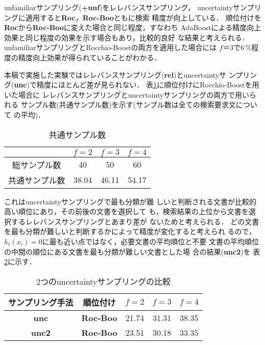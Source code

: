 unfamiliarサンプリング({\bf +unf})をレレバンスサンプリング，
uncertaintyサンプリングに適用すると{\bf Roc}，{\bf Roc-Boo}ともに検索
精度が向上している．
順位付けを{\bf Roc}から{\bf Roc-Boo}に変えた場合と同じ程度，すなわち
AdaBoostによる精度向上効果と同じ程度の効果を示す場合もあり，比較的良好
な結果と考えられる．
unfamiliarサンプリングとRocchio-Boostの両方を適用した場合には
$f＝3$で6\,\%程度の精度向上効果が得られていることがわかる．

本稿で実施した実験ではレレバンスサンプリング({\bf rel})とuncertaintyサ
ンプリング({\bf unc})で精度にほとんど差が見られない．
表\ref{table:common_sample}に順位付けにRocchio-Boostを用いた場合に
レレバンスサンプリングとuncertaintyサンプリングの両方で用いられる
サンプル数(共通サンプル数)を示す(サンプル数は全ての検索要求文について
の平均)．
\begin{table}[tbp]
\begin{center}
\caption{共通サンプル数}
\begin{tabular}{c||c|c|c} \hline
 &  $f = 2$ & $f = 3$ & $f = 4$\\ \hline \hline
総サンプル数 & 40 & 50 & 60 \\ \hline
共通サンプル数 & 38.04 & 46.11 & 54.17 \\ \hline
\end{tabular}
\label{table:common_sample}
\end{center}
\end{table}
これはuncertaintyサンプリングで最も分類が難
しいと判断される文書が比較的高い順位にあり，その前後の文書を選択して
も，検索結果の上位から文書を選択するレレバンスサンプリングとあまり差が
ないためと考えられる．
どの文書を最も分類が難しいと判断するかによって精度が変化すると考えられ
るので，$h_{t}(x_{i})=0$に最も近い点ではなく，必要文書の平均順位と不要
文書の平均順位の中間の順位にある文書を最も分類が難しい文書とした場
合の結果({\bf unc2})を
表\ref{table:unc_n30}に示す．

\begin{table}[tbp]
\begin{center}
\caption{2つのuncertaintyサンプリングの比較}
\begin{tabular}{c|c||c|c|c} \hline
サンプリング手法 & 順位付け & $f = 2$ & $f = 3$ & $f = 4$\\ \hline \hline
{\bf unc}  & {\bf Roc-Boo} & 21.74 & 31.31 & 38.35 \\ \hline
{\bf unc2} & {\bf Roc-Boo} & 23.51 & 30.18 & 33.35 \\ \hline
\end{tabular}
\label{table:unc_n30}
\end{center}
\end{table}

